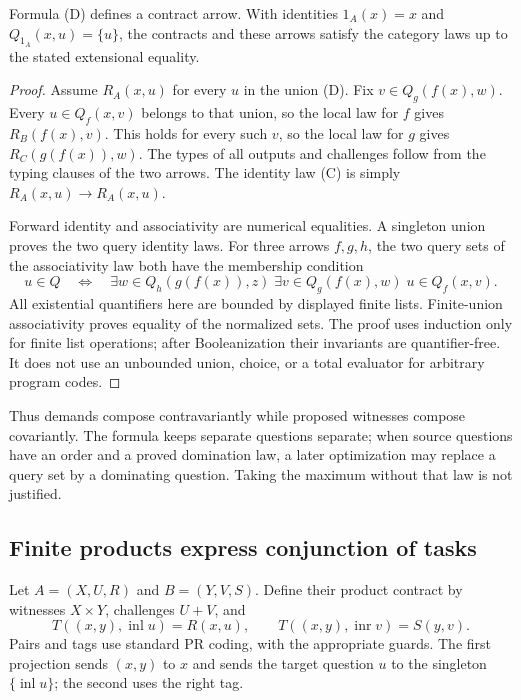 \begin{theorem}
Formula (D) defines a contract arrow.  With identities
$1_A(x)=x$ and $Q_{1_A}(x,u)=\{u\}$, the contracts and these arrows satisfy the
category laws up to the stated extensional equality.
\end{theorem}
\begin{proof}
Assume $R_A(x,u)$ for every $u$ in the union (D).  Fix
$v\in Q_g(f(x),w)$.  Every $u\in Q_f(x,v)$ belongs to that union, so the local
law for $f$ gives $R_B(f(x),v)$.  This holds for every such $v$, so the local law
for $g$ gives $R_C(g(f(x)),w)$.  The types of all outputs and challenges follow
from the typing clauses of the two arrows.  The identity law (C) is simply
$R_A(x,u)\to R_A(x,u)$.

Forward identity and associativity are numerical equalities.  A singleton
union proves the two query identity laws.  For three arrows $f,g,h$, the two
query sets of the associativity law both have the membership condition
\[
 u\in Q
 \quad\Longleftrightarrow\quad
 \exists w\in Q_h(g(f(x)),z)\;
 \exists v\in Q_g(f(x),w)\;
 u\in Q_f(x,v).
\]
All existential quantifiers here are bounded by displayed finite lists.
Finite-union associativity proves equality of the normalized sets.  The proof
uses induction only for finite list operations; after Booleanization their
invariants are quantifier-free.  It does not use an unbounded union, choice,
or a total evaluator for arbitrary program codes.
\end{proof}

Thus demands compose contravariantly while proposed witnesses compose
covariantly.  The formula keeps separate questions separate; when source
questions have an order and a proved domination law, a later optimization may
replace a query set by a dominating question.  Taking the maximum without that
law is not justified.

\subsection{Finite products express conjunction of tasks}

Let $A=(X,U,R)$ and $B=(Y,V,S)$.  Define their product contract by witnesses
$X\times Y$, challenges $U+V$, and
\[
 T((x,y),\operatorname{inl}u)=R(x,u),\qquad
 T((x,y),\operatorname{inr}v)=S(y,v).
\]
Pairs and tags use standard PR coding, with the appropriate guards.
The first projection sends $(x,y)$ to $x$ and sends the target question $u$ to
the singleton $\{\operatorname{inl}u\}$; the second uses the right tag.

